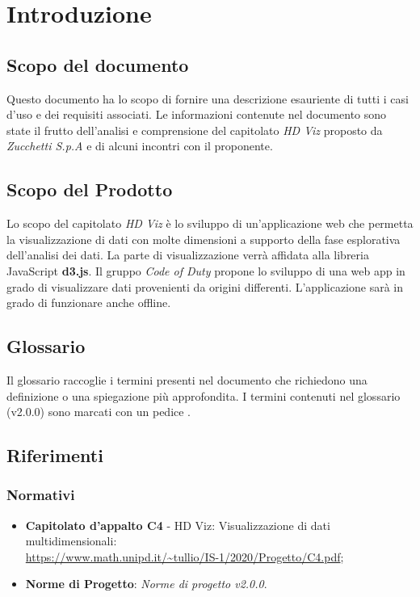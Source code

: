 \section{Introduzione}
    \subsection{Scopo del documento}
    Questo documento ha lo scopo di fornire una descrizione esauriente di tutti i casi d'uso e dei requisiti associati. Le informazioni contenute nel documento sono state il frutto dell'analisi e comprensione del capitolato \emph{HD Viz} proposto da \emph{Zucchetti S.p.A} e di alcuni incontri con il proponente.
    \subsection{Scopo del Prodotto}
    Lo scopo del capitolato \emph{HD Viz} è lo sviluppo di un'applicazione web che permetta la visualizzazione di dati con molte dimensioni a supporto della fase esplorativa dell'analisi dei dati. La parte di visualizzazione verrà affidata alla libreria JavaScript \textbf{d3.js}. Il gruppo \emph{Code of Duty} propone lo sviluppo di una web app in grado di visualizzare dati provenienti da origini differenti. L'applicazione sarà in grado di funzionare anche offline.
    \subsection{Glossario}
    Il glossario raccoglie i termini presenti nel documento che richiedono una definizione o una spiegazione più approfondita. I termini contenuti nel glossario (v2.0.0) sono marcati con un pedice \glo{}.
    \subsection{Riferimenti}
    \subsubsection{Normativi}
    \begin{itemize}
        \item \textbf{Capitolato d'appalto C4} - HD Viz: Visualizzazione di dati multidimensionali:\\\url{https://www.math.unipd.it/~tullio/IS-1/2020/Progetto/C4.pdf};
        \item \textbf{Norme di Progetto}: \emph{Norme di progetto v2.0.0}.
    \end{itemize}

